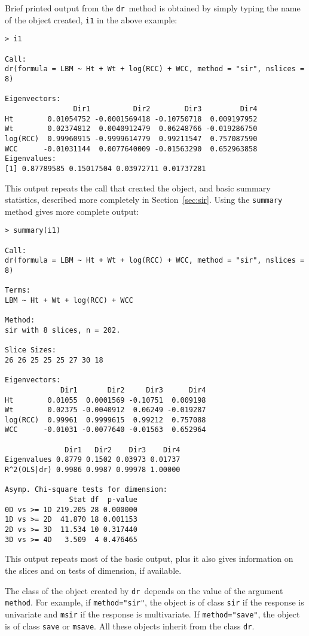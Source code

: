 \documentclass{article}
\newcommand{\dcode}[1]{{\small{\tt #1}}}
\newcommand{\dr}{{\tt dr}}
\begin{document}
Brief printed output from the \dr\ method is obtained by simply typing
the name of the object created, \dcode{i1} in the above example:
\small\begin{verbatim}
> i1

Call:
dr(formula = LBM ~ Ht + Wt + log(RCC) + WCC, method = "sir", nslices = 8)

Eigenvectors:
                Dir1          Dir2        Dir3         Dir4
Ht        0.01054752 -0.0001569418 -0.10750718  0.009197952
Wt        0.02374812  0.0040912479  0.06248766 -0.019286750
log(RCC)  0.99960915 -0.9999614779  0.99211547  0.757087590
WCC      -0.01031144  0.0077640009 -0.01563290  0.652963858
Eigenvalues:
[1] 0.87789585 0.15017504 0.03972711 0.01737281
\end{verbatim}
\normalsize
\noindent This output repeats the call that created the object, and basic summary
statistics, described more completely in Section~\ref{sec:sir}.  Using the
\dcode{summary} method gives more complete output:
\small\begin{verbatim}
> summary(i1)

Call:
dr(formula = LBM ~ Ht + Wt + log(RCC) + WCC, method = "sir", nslices = 8)

Terms:
LBM ~ Ht + Wt + log(RCC) + WCC

Method:
sir with 8 slices, n = 202.

Slice Sizes:
26 26 25 25 25 27 30 18

Eigenvectors:
             Dir1       Dir2     Dir3      Dir4
Ht        0.01055  0.0001569 -0.10751  0.009198
Wt        0.02375 -0.0040912  0.06249 -0.019287
log(RCC)  0.99961  0.9999615  0.99212  0.757088
WCC      -0.01031 -0.0077640 -0.01563  0.652964

              Dir1   Dir2    Dir3    Dir4
Eigenvalues 0.8779 0.1502 0.03973 0.01737
R^2(OLS|dr) 0.9986 0.9987 0.99978 1.00000

Asymp. Chi-square tests for dimension:
               Stat df  p-value
0D vs >= 1D 219.205 28 0.000000
1D vs >= 2D  41.870 18 0.001153
2D vs >= 3D  11.534 10 0.317440
3D vs >= 4D   3.509  4 0.476465
\end{verbatim}
\normalsize
\noindent
This output repeats most of the basic output, plus it also gives information
on the slices and on tests of dimension, if available.

The class of the object created by \dr\ depends on the value of
the argument \dcode{method}.  For example, if
\dcode{method="sir"}, the object is of class \dcode{sir} if the response is
univariate and \dcode{msir} if the response is multivariate.  If
\dcode{method="save"}, the object is of class \dcode{save} or \dcode{msave}.
All these objects inherit from the class \dcode{dr}.
\end{document}
